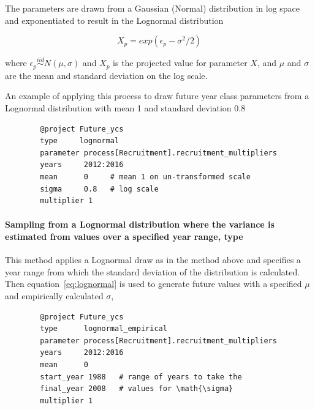 The parameters are drawn from a Gaussian (Normal) distribution in log space and exponentiated  to result in the Lognormal distribution

\begin{equation}\label{eq:lognormal}
X_p = exp(\epsilon_p - \sigma^2 / 2)
\end{equation}

where $\epsilon_p\stackrel{iid}{\sim}N(\mu,\sigma)$ and $X_p$ is the projected value for parameter $X$, and $\mu$ and $\sigma$ are the mean and standard deviation on the log scale.

An example of applying this process to draw future year class parameters from a Lognormal distribution with mean 1 and standard deviation 0.8

{\small{\begin{verbatim}
		@project Future_ycs
		type     lognormal
		parameter process[Recruitment].recruitment_multipliers
		years     2012:2016
		mean      0     # mean 1 on un-transformed scale
		sigma     0.8   # log scale
		multiplier 1
		\end{verbatim}}}

\paragraph[Lognormal-Empirical]{Sampling from a Lognormal distribution where the  variance is estimated from values over a specified year range, type   }\label{sec:Project-LogNormalEmpirical} 

This method applies a Lognormal draw as in the  method above and specifies a year range from which the standard deviation of the distribution is calculated. Then equation~\eqref{eq:lognormal} is used to generate future values with a specified $\mu$ and empirically calculated $\sigma$,

{\small{\begin{verbatim}
		@project Future_ycs
		type      lognormal_empirical
		parameter process[Recruitment].recruitment_multipliers
		years     2012:2016
		mean      0
		start_year 1988   # range of years to take the
		final_year 2008   # values for \math{\sigma}
		multiplier 1
		\end{verbatim}}}


